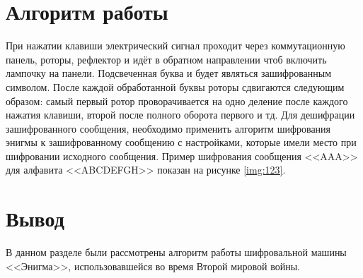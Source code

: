 \section{Алгоритм работы}

При нажатии клавиши электрический сигнал проходит через коммутационную панель, роторы, рефлектор и идёт в обратном направлении чтоб включить лампочку на панели. Подсвеченная буква и будет являться зашифрованным символом. После каждой обработанной буквы роторы сдвигаются следующим образом: самый первый ротор проворачивается на одно деление после каждого нажатия клавиши, второй после полного оборота первого и тд. Для дешифрации зашифрованного сообщения, необходимо применить алгоритм шифрования энигмы к зашифрованному сообщению с настройками, которые имели место при шифровании исходного сообщения. Пример шифрования сообщения <<AAA>> для алфавита <<ABCDEFGH>> показан на рисунке \ref{img:123}.

\FloatBarrier

\section*{Вывод}

В данном разделе были рассмотрены алгоритм работы шифровальной машины <<Энигма>>, использовавшейся во время Второй мировой войны.


